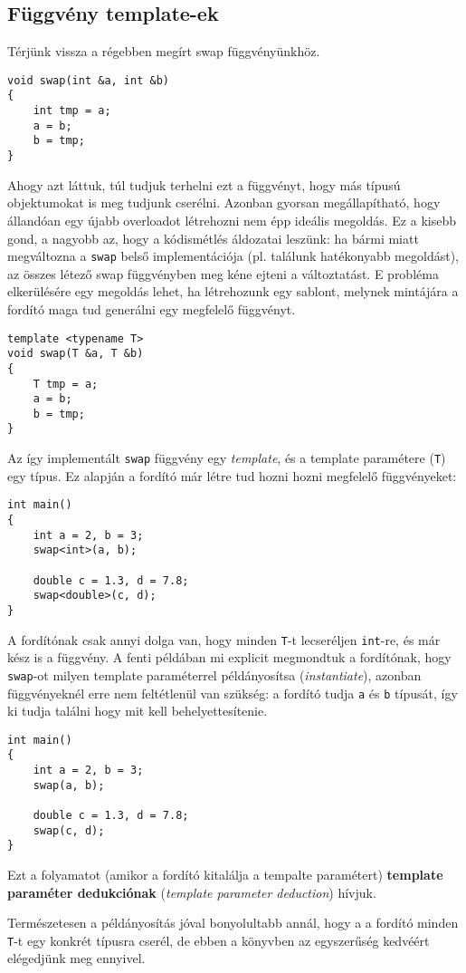 \documentclass[a4paper,11.5pt,table]{article}
\begin{document}
	\subsection{Függvény template-ek}
	Térjünk vissza a régebben megírt swap függvényünkhöz.
	\begin{lstlisting}
void swap(int &a, int &b)
{
	int tmp = a;
	a = b;
	b = tmp;
}
	\end{lstlisting}
	Ahogy azt láttuk, túl tudjuk terhelni ezt a függvényt, hogy más típusú objektumokat is meg tudjunk cserélni.
	Azonban gyorsan megállapítható, hogy állandóan egy újabb overloadot létrehozni nem épp ideális megoldás. Ez a kisebb gond, a nagyobb az, hogy a kódismétlés áldozatai leszünk: ha bármi miatt megváltozna a \texttt{swap} belső implementációja (pl. találunk hatékonyabb megoldást), az összes létező swap függvényben meg kéne ejteni a változtatást. E probléma elkerülésére egy megoldás lehet, ha létrehozunk egy sablont, melynek mintájára a fordító maga tud generálni egy megfelelő függvényt.
	\begin{lstlisting}
template <typename T>
void swap(T &a, T &b)
{
	T tmp = a;
	a = b;
	b = tmp;
}
	\end{lstlisting}
	Az így implementált \texttt{swap} függvény egy \textit{template}, és a template paramétere (\texttt{T}) egy típus. Ez alapján a fordító már létre tud hozni hozni megfelelő függvényeket:
	\begin{lstlisting}
int main()
{
	int a = 2, b = 3;
	swap<int>(a, b);
	
	double c = 1.3, d = 7.8;
	swap<double>(c, d);
}
	\end{lstlisting}
	A fordítónak csak annyi dolga van, hogy minden \texttt{T}-t lecseréljen \texttt{int}-re, és már kész is a függvény. A fenti példában mi explicit megmondtuk a fordítónak, hogy \texttt{swap}-ot milyen template paraméterrel {példányosítsa} (\textit{instantiate}), azonban függvényeknél erre nem feltétlenül van szükség: a fordító tudja \texttt{a} és \texttt{b} típusát, így ki tudja találni hogy mit kell behelyettesítenie.
	\begin{lstlisting}
int main()
{
	int a = 2, b = 3;
	swap(a, b);
	
	double c = 1.3, d = 7.8;
	swap(c, d);
}
	\end{lstlisting}
	Ezt a folyamatot (amikor a fordító kitalálja a tempalte paramétert) \textbf{template paraméter dedukciónak} (\textit{template parameter deduction}) hívjuk.
	\begin{note}
		Természetesen a példányosítás jóval bonyolultabb annál, hogy a a fordító minden \texttt{T}-t egy konkrét típusra cserél, de ebben a könyvben az egyszerűség kedvéért elégedjünk meg ennyivel.
	\end{note}
\end{document}
